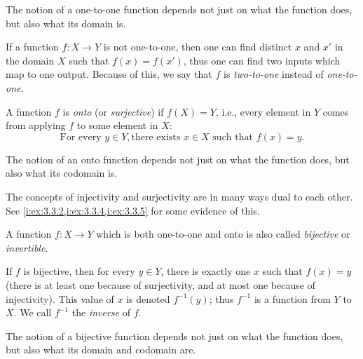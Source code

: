 \begin{note}
  The notion of a one-to-one function depends not just on what the function does, but also what its domain is.
\end{note}

\setcounter{thm}{15}
\begin{rmk}\label{i:3.3.16}
  If a function \(f : X \to Y\) is not one-to-one, then one can find distinct \(x\) and \(x'\) in the domain \(X\) such that \(f(x) = f(x')\), thus one can find two inputs which map to one output.
  Because of this, we say that \(f\) is \emph{two-to-one} instead of \emph{one-to-one}.
\end{rmk}

\begin{defn}\label{i:3.3.17}
  A function \(f\) is \emph{onto} (or \emph{surjective}) if \(f(X) = Y\), i.e., every element in \(Y\) comes from applying \(f\) to some element in \(X\):
  \[
    \text{For every } y \in Y, \text{there exists } x \in X \text{ such that } f(x) = y.
  \]
\end{defn}

\begin{note}
  The notion of an onto function depends not just on what the function does, but also what its codomain is.
\end{note}

\setcounter{thm}{18}
\begin{rmk}\label{i:3.3.19}
  The concepts of injectivity and surjectivity are in many ways dual to each other.
  See \cref{i:ex:3.3.2,i:ex:3.3.4,i:ex:3.3.5} for some evidence of this.
\end{rmk}

\begin{defn}\label{i:3.3.20}
  A function \(f : X \to Y\) which is both one-to-one and onto is also called \emph{bijective} or \emph{invertible}.

  If \(f\) is bijective, then for every \(y \in Y\), there is exactly one \(x\) such that \(f(x) = y\) (there is at least one because of surjectivity, and at most one because of injectivity).
  This value of \(x\) is denoted \(f^{-1}(y)\); thus \(f^{-1}\) is a function from \(Y\) to \(X\).
  We call \(f^{-1}\) the \emph{inverse} of \(f\).
\end{defn}

\begin{note}
  The notion of a bijective function depends not just on what the function does, but also what its domain and codomain are.
\end{note}


